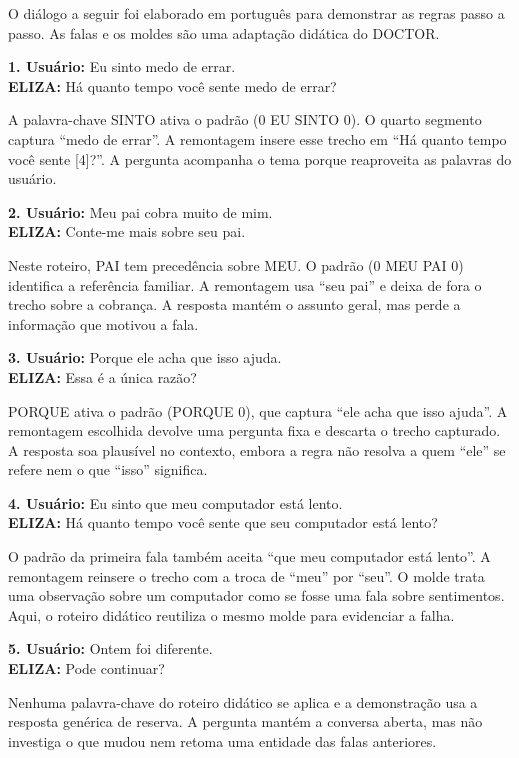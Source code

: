 \documentclass[12pt,a4paper]{article}
\begin{document}
O diálogo a seguir foi elaborado em português para demonstrar as regras passo a passo. As falas e os moldes são uma adaptação didática do DOCTOR.

\noindent \textbf{1. Usuário:} Eu sinto medo de errar.\\
\textbf{ELIZA:} Há quanto tempo você sente medo de errar?

A palavra-chave SINTO ativa o padrão (0 EU SINTO 0). O quarto segmento captura ``medo de errar''. A remontagem insere esse trecho em ``Há quanto tempo você sente [4]?''. A pergunta acompanha o tema porque reaproveita as palavras do usuário.

\noindent \textbf{2. Usuário:} Meu pai cobra muito de mim.\\
\textbf{ELIZA:} Conte-me mais sobre seu pai.

Neste roteiro, PAI tem precedência sobre MEU. O padrão (0 MEU PAI 0) identifica a referência familiar. A remontagem usa ``seu pai'' e deixa de fora o trecho sobre a cobrança. A resposta mantém o assunto geral, mas perde a informação que motivou a fala.

\noindent \textbf{3. Usuário:} Porque ele acha que isso ajuda.\\
\textbf{ELIZA:} Essa é a única razão?

PORQUE ativa o padrão (PORQUE 0), que captura ``ele acha que isso ajuda''. A remontagem escolhida devolve uma pergunta fixa e descarta o trecho capturado. A resposta soa plausível no contexto, embora a regra não resolva a quem ``ele'' se refere nem o que ``isso'' significa.

\noindent \textbf{4. Usuário:} Eu sinto que meu computador está lento.\\
\textbf{ELIZA:} Há quanto tempo você sente que seu computador está lento?

O padrão da primeira fala também aceita ``que meu computador está lento''. A remontagem reinsere o trecho com a troca de ``meu'' por ``seu''. O molde trata uma observação sobre um computador como se fosse uma fala sobre sentimentos. Aqui, o roteiro didático reutiliza o mesmo molde para evidenciar a falha.

\noindent \textbf{5. Usuário:} Ontem foi diferente.\\
\textbf{ELIZA:} Pode continuar?

Nenhuma palavra-chave do roteiro didático se aplica e a demonstração usa a resposta genérica de reserva. A pergunta mantém a conversa aberta, mas não investiga o que mudou nem retoma uma entidade das falas anteriores.
\end{document}
